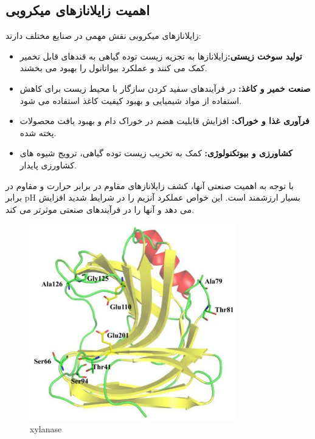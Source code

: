         \subsection{اهمیت زایلانازهای میکروبی}
            زایلانازهای میکروبی نقش مهمی در صنایع مختلف دارند:
            \begin{itemize}
                \item \textbf{تولید سوخت زیستی:}زایلانازها به تجزیه زیست توده گیاهی به قندهای قابل تخمیر کمک می کنند و عملکرد بیواتانول را بهبود می بخشند.
                \item \textbf{صنعت خمیر و کاغذ:} در فرآیندهای سفید کردن سازگار با محیط زیست برای کاهش استفاده از مواد شیمیایی و بهبود کیفیت کاغذ استفاده می شود.
                \item \textbf{فرآوری غذا و خوراک:} افزایش قابلیت هضم در خوراک دام و بهبود بافت محصولات پخته شده.
                \item \textbf{کشاورزی و بیوتکنولوژی:} کمک به تخریب زیست توده گیاهی، ترویج شیوه های کشاورزی پایدار.
            \end{itemize}
            با توجه به اهمیت صنعتی آنها، کشف زایلانازهای مقاوم در برابر حرارت و مقاوم در برابر pH بسیار ارزشمند است. این خواص عملکرد آنزیم را در شرایط شدید افزایش می دهد و آنها را در فرآیندهای صنعتی موثرتر می کند.
            \begin{figure}[H]
                \centering
                \includegraphics[width=0.8\textwidth]{images/xylanase.jpg} %
                \caption{xylanase}
                \label{fig:xylanase}
            \end{figure}

